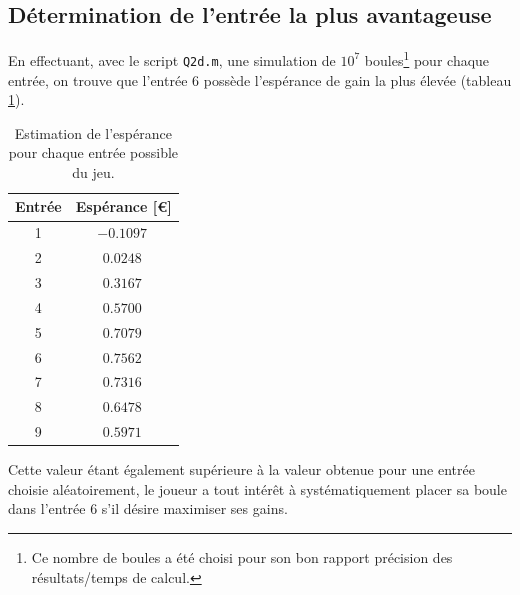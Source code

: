 \documentclass[a4paper, 12pt]{article}
\begin{document}
    \subsection{Détermination de l'entrée la plus avantageuse}
    En effectuant, avec le script \texttt{Q2d.m}, une simulation de \(10^7\) boules\footnote{Ce nombre de boules a été choisi pour son bon rapport précision des résultats/temps de calcul.} pour chaque entrée, on trouve que l'entrée 6 possède l'espérance de gain la plus élevée (tableau \ref{table:tab_Q2d}).\par
    \begin{table}[!h]
        \centering
        \begin{tabular}{|c|c|}
            \hline
            \textbf{Entrée} & \textbf{Espérance} [\euro{}]\\
            \hline
            1 & \(\SI{-0.1097}{}\)\\
            \hline
            2 & \(\SI{0.0248}{}\)\\
            \hline
            3 & \(\SI{0.3167}{}\)\\
            \hline
            4 & \(\SI{0.5700}{}\)\\
            \hline
            5 & \(\SI{0.7079}{}\)\\
            \hline
            \rowcolor[RGB]{230,230,230}6 & \(\SI{0.7562}{}\)\\
            \hline
            7 & \(\SI{0.7316}{}\)\\
            \hline
            8 & \(\SI{0.6478}{}\)\\
            \hline
            9 & \(\SI{0.5971}{}\)\\
            \hline
        \end{tabular}
        \caption{Estimation de l'espérance pour chaque entrée possible du jeu.}
        \label{table:tab_Q2d}
    \end{table}
    Cette valeur étant également supérieure à la valeur obtenue pour une entrée choisie aléatoirement, le joueur a tout intérêt à systématiquement placer sa boule dans l'entrée 6 s'il désire maximiser ses gains.
\end{document}
